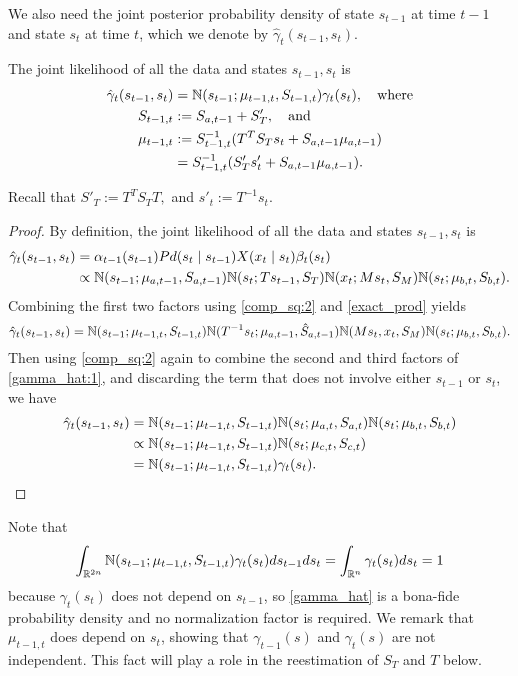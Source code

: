 \documentclass[12pt,leqno]{article}
\begin{document}
We also need the joint posterior probability density of state $s_{t-1}$ at time $t-1$ and state $s_t$ at time $t$,
which we denote by $\hat{\gamma}_t(s_{t-1},s_t)$.
\begin{Lem}\label{gamma_hat}
The joint likelihood of all the data and states $s_{t-1},s_t$ is
\begin{align*}
  \hat{\gamma}_t(s_{t-1},s_t) &= {\mathbb N}(s_{t-1};\mu_{t-1,t},S_{t-1,t})\gamma_t(s_t), \quad\text{where} \\
  S_{t-1,t} &:= S_{a,t-1}+S_T',\quad\text{and}\\
  \mu_{t-1,t} &:= S_{t-1,t}^{-1}(T^TS_Ts_t + S_{a,t-1}\mu_{a,t-1})\\
  &= S_{t-1,t}^{-1}(S'_Ts'_t + S_{a,t-1}\mu_{a,t-1}).\\
\end{align*}
\end{Lem}
Recall that $S'_T := T^TS_TT,$ and $s'_t := T^{-1}s_t$.
\begin{proof}
  By definition, the joint likelihood of all the data and states $s_{t-1},s_t$ is 
  \begin{align*}
    \hat{\gamma}_t(s_{t-1},s_t) &= \alpha_{t-1}(s_{t-1})Pd(s_t\mid s_{t-1})X(x_t\mid s_t)\beta_t(s_t) \\
    &\propto {\mathbb N}(s_{t-1};\mu_{a,t-1},S_{a,t-1}){\mathbb N}(s_t;Ts_{t-1},S_T){\mathbb N}(x_t;Ms_t,S_M){\mathbb N}(s_t;\mu_{b,t},S_{b,t}).
  \end{align*}
  Combining the first two factors using \eqref{comp_sq:2} and \eqref{exact_prod} yields
  \begin{equation}\label{gamma_hat:1}
    \hat{\gamma}_t(s_{t-1},s_t) = {\mathbb N}(s_{t-1};\mu_{t-1,t},S_{t-1,t}){\mathbb N}(T^{-1}s_t;\mu_{a,t-1},\hat{S}_{a,t-1}){\mathbb N}(Ms_t,x_t,S_M){\mathbb N}(s_t;\mu_{b,t},S_{b,t}).
  \end{equation}
  Then using \eqref{comp_sq:2} again to combine the second and third factors of \eqref{gamma_hat:1}, and discarding
  the term that does not involve either $s_{t-1}$ or $s_t$, we have
    \begin{align*}
      \hat{\gamma}_t(s_{t-1},s_t) &= {\mathbb N}(s_{t-1};\mu_{t-1,t},S_{t-1,t}){\mathbb N}(s_t;\mu_{a,t},S_{a,t}){\mathbb N}(s_t;\mu_{b,t},S_{b,t})\\
      &\propto {\mathbb N}(s_{t-1};\mu_{t-1,t},S_{t-1,t}){\mathbb N}(s_t;\mu_{c,t},S_{c,t})\\ 
      &= {\mathbb N}(s_{t-1};\mu_{t-1,t},S_{t-1,t})\gamma_t(s_t).
    \end{align*}
\end{proof}
  Note that
  $$
  \int_{{\mathbb R}^{2n}}{\mathbb N}(s_{t-1};\mu_{t-1,t},S_{t-1,t})\gamma_t(s_t)ds_{t-1}ds_t = \int_{{\mathbb R}^n}\gamma_t(s_t)ds_t = 1 
  $$
  because $\gamma_t(s_t)$ does not depend on $s_{t-1}$, so \eqref{gamma_hat} is a bona-fide probability density and no
  normalization factor is required.  We remark that $\mu_{t-1,t}$ does depend on $s_t$, showing that $\gamma_{t-1}(s)$
  and $\gamma_t(s)$ are not independent.  This fact will play a role in the reestimation of $S_T$ and $T$ below.
  
\end{document}
